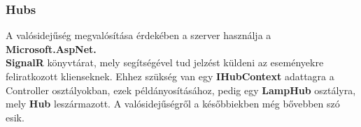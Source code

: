 \documentclass[a4paper,12pt]{report}
\begin{document}
\subsubsection{Hubs}
    A valósidejűség megvalósítása érdekében a szerver használja a \textbf{Microsoft.AspNet.\\SignalR} könyvtárat, mely segítségével
    tud jelzést küldeni az eseményekre feliratkozott klienseknek. Ehhez szükség van egy \textbf{IHubContext} adattagra a Controller
    osztályokban, ezek példányosításához, pedig egy \textbf{LampHub} osztályra, mely \textbf{Hub} leszármazott. A valósidejűségről
    a későbbiekben még bővebben szó esik.
\end{document}
